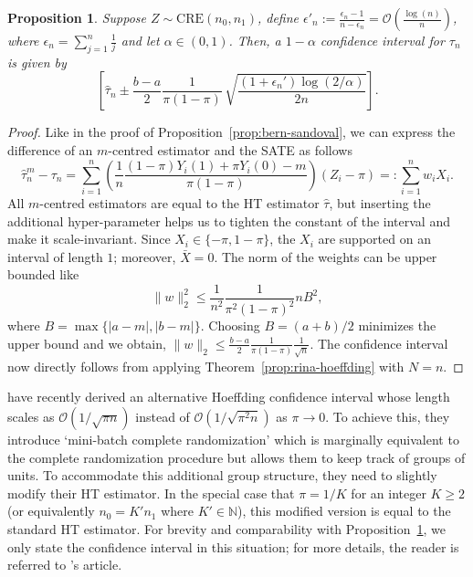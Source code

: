 \documentclass[aos]{imsart2}
\theoremstyle{plain}
\newtheorem{proposition}[theorem]{Proposition}
\theoremstyle{definition}
\newcommand{\tauh}{\hat{\tau}}
\newcommand{\cre}{\mathrm{CRE}}
\newcommand{\tf}[1]{\textcolor{red}{[TF: #1]}}
\begin{document}

\begin{proposition}\label{prop:cre-hoeffding}
    Suppose $Z\sim \cre(n_0,n_1)$, define $\epsilon'_n := \frac{\epsilon_n-1}{n-\epsilon_n} = \mathcal{O}(\frac{\log(n)}{n})$, where $\epsilon_n = \sum_{j=1}^n \frac{1}{j}$ and let $\alpha \in (0,1)$. Then, a $1-\alpha$ confidence interval for $\tau_n$ is given by
    \begin{equation*}
        \left[\tauh_n \pm \frac{b-a}{2} \frac{1}{\pi(1-\pi)}\, \sqrt{\frac{(1+\epsilon_n')\log(2/\alpha)}{2n}}\right].
    \end{equation*}
\end{proposition}
\begin{proof}
    Like in the proof of Proposition~\ref{prop:bern-sandoval}, we can express the difference of an $m$-centred estimator and the SATE as follows
    \begin{equation*}
        \tauh_n^m-\tau_n = \sum_{i=1}^n \left(\frac{1}{n}\frac{(1-\pi)Y_i(1)+\pi Y_i(0) -m}{\pi(1-\pi)}\right) (Z_i-\pi) =: \sum_{i=1}^n w_i X_i.
    \end{equation*}
    All $m$-centred estimators are equal to the HT estimator $\tauh$, but inserting the additional hyper-parameter helps us to tighten the constant of the interval and make it scale-invariant. Since $X_i \in \{-\pi,1-\pi\}$, the $X_i$ are supported on an interval of length $1$; moreover, $\bar{X}=0$. The norm of the weights can be upper bounded like
    \begin{equation*}
        \lVert w \rVert_2^2 \leq \frac{1}{n^2} \frac{1}{\pi^2(1-\pi)^2} n B^2,
    \end{equation*}
    where $B=\max\{\lvert a-m\rvert, \lvert b- m \rvert\}$. Choosing $B = (a+b)/2$ minimizes the upper bound and we obtain, $\lVert w \rVert_2 \leq \frac{b-a}{2}\frac{1}{\pi(1-\pi)}\frac{1}{\sqrt{n}}$. The confidence interval now directly follows from applying Theorem~\ref{prop:rina-hoeffding} with $N=n$.
\end{proof}

\citet{sandoval_nonasymptotic_2026} have recently derived an alternative Hoeffding confidence interval whose length scales as $\mathcal{O}(1/\sqrt{\pi n})$ instead of $\mathcal{O}(1/\sqrt{\pi^2 n})$ as $\pi \to 0$. To achieve this, they introduce `mini-batch complete randomization' which is marginally equivalent to the complete randomization procedure but allows them to keep track of groups of units. To accommodate this additional group structure, they need to slightly modify their HT estimator. In the special case that $\pi = 1/K$ for an integer $K\geq 2$ (or equivalently $n_0 = K'n_1$ where {$K'\in\mathbb{N}$}), this modified version is equal to the standard HT estimator. For brevity and comparability with Proposition~\ref{prop:cre-hoeffding}, we only state the confidence interval in this situation; for more details, the reader is referred to \citeauthor{sandoval_nonasymptotic_2026}'s article.
\end{document}
